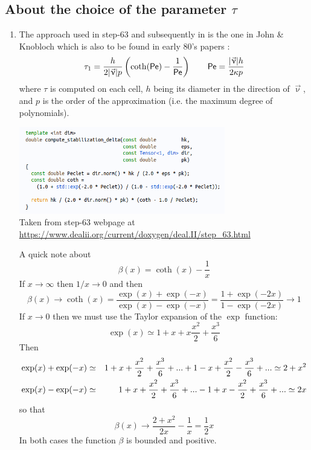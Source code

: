 \subsection{About the choice of the parameter $\tau$}\label{ss:tausupg}

\begin{enumerate}
\item The approach used in step-63 and subsequently in \aspect{} is the 
one in John \& Knobloch \cite{jokn06,knob08} which is also to be found in early 
80's papers \cite{brhu82,hubr82}:
\[
\tau_1 = \frac{h}{2 |\vec\upnu| p} \left( \coth ({\mathsf{Pe}}) - \frac{1}{{\mathsf{Pe}}} \right)
\qquad
{\mathsf{Pe}} = \frac{|\vec\upnu| h}{2 \kappa p}
\]
where $\tau$ is computed on each cell, $h$ being its diameter in the direction of $\vec\upnu$, 
and $p$ is the order of the approximation (i.e. the maximum degree of polynomials).

\begin{center}
\includegraphics[width=9cm]{images/supg/step63}\\
{\captionfont Taken from step-63 webpage 
at \url{https://www.dealii.org/current/doxygen/deal.II/step_63.html}}
\end{center}

A quick note about 
\[
\beta(x) = \coth (x) -\frac{1}{x}
\]
If $x\rightarrow \infty$ then $1/x \rightarrow 0$ and then
\[
\beta(x) \rightarrow \coth(x) 
= \frac{\exp(x) + \exp(-x)}{\exp(x)-\exp(-x)}
= \frac{1 + \exp(-2x)}{1-\exp(-2x)} \rightarrow 1
\]
If $x \rightarrow 0$ then we must use the Taylor expansion of the $\exp$ function:
\[
\exp(x) \simeq 1 +x +x\frac{x^2}{2} + \frac{x^3}{6}
\]
Then 
\begin{eqnarray}
\exp(x) + \exp(-x)
&\simeq& 1 +x +\frac{x^2}{2} + \frac{x^3}{6} + ...
+ 1 -x +\frac{x^2}{2} - \frac{x^3}{6} + ...
\simeq 2 + x^2 \nonumber\\
\exp(x) - \exp(-x) 
&\simeq& 1 +x +\frac{x^2}{2} + \frac{x^3}{6} + ...
- 1 +x -\frac{x^2}{2} + \frac{x^3}{6} + ...
\simeq 2x 
\end{eqnarray}
so that 
\[
\beta(x) \rightarrow \frac{2+x^2}{2x} - \frac{1}{x} = \frac12 x
\]
In both cases the function $\beta$ is bounded and positive. 




\end{enumerate}
